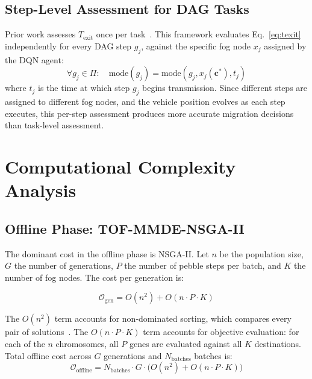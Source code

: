 \documentclass[12pt,a4paper]{article}
\theoremstyle{definition}
\theoremstyle{remark}
\begin{document}
\subsection{Step-Level Assessment for DAG Tasks}

Prior work assesses $T_{\text{exit}}$ once per task~\cite{mavto2024}.
This framework evaluates Eq.~\eqref{eq:texit} independently for every
DAG step $g_j$, against the specific fog node $x_j$ assigned by the DQN agent:
\begin{equation}
  \forall g_j \in \Pi: \quad
  \mathrm{mode}(g_j) = \mathrm{mode}(g_j, x_j(\mathbf{c}^*), t_j)
  \label{eq:per_step}
\end{equation}
where $t_j$ is the time at which step $g_j$ begins transmission. Since
different steps are assigned to different fog nodes, and the vehicle position
evolves as each step executes, this per-step assessment produces more
accurate migration decisions than task-level assessment.

\section{Computational Complexity Analysis}
\label{sec:complexity}

\subsection{Offline Phase: TOF-MMDE-NSGA-II}

The dominant cost in the offline phase is NSGA-II. Let $n$ be the population
size, $G$ the number of generations, $P$ the number of pebble steps per batch,
and $K$ the number of fog nodes. The cost per generation is:

\begin{equation}
  \mathcal{O}_{\text{gen}} = O(n^2) + O(n \cdot P \cdot K)
  \label{eq:nsga_gen_cost}
\end{equation}

The $O(n^2)$ term accounts for non-dominated sorting, which compares every
pair of solutions~\cite{deb2002nsga2}. The $O(n \cdot P \cdot K)$ term
accounts for objective evaluation: for each of the $n$ chromosomes, all
$P$ genes are evaluated against all $K$ destinations. Total offline cost
across $G$ generations and $N_{\text{batches}}$ batches is:
\begin{equation}
  \mathcal{O}_{\text{offline}} =
  N_{\text{batches}} \cdot G \cdot \bigl(O(n^2) + O(n \cdot P \cdot K)\bigr)
  \label{eq:offline_total}
\end{equation}
\end{document}
